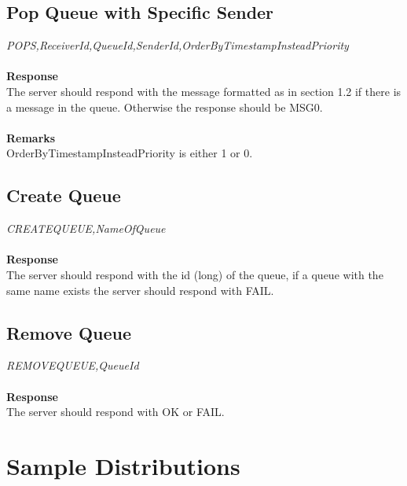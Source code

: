 \documentclass{article}
\begin{document}
\begin{table}
\begin{tabular}
            \subsection{Pop Queue with Specific Sender}
                \indent\indent\textit{POPS,ReceiverId,QueueId,SenderId,OrderByTimestampInsteadPriority}\\
                \\
                \textbf{Response}\\
                The server should respond with the message formatted as in section 1.2 if there is a message in the queue. Otherwise the response should be MSG0.\\
                \\
                \textbf{Remarks}\\
                OrderByTimestampInsteadPriority is either 1 or 0.

            \subsection{Create Queue}
                \indent\indent\textit{CREATEQUEUE,NameOfQueue}\\
                \\
                \textbf{Response}\\
                The server should respond with the id (long) of the queue, if a queue with the same name exists the server should respond with FAIL.

            \subsection{Remove Queue}
                \indent\indent\textit{REMOVEQUEUE,QueueId}\\
                \\
                \textbf{Response}\\
                The server should respond with OK or FAIL.

        \section{Sample Distributions}
        

\end{tabular}
\end{table}
\end{document}
